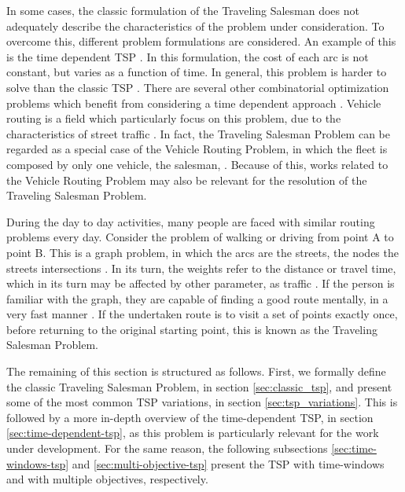 In some cases, the classic formulation of the Traveling Salesman does not adequately describe the characteristics of the problem under consideration. To overcome this, different problem formulations are considered. An example of this is the time dependent TSP \cite{cite_12}. In this formulation, the cost of each arc is not constant, but varies as a function of time. In general, this problem is harder to solve than the classic TSP \cite{cite_21}. There are several other combinatorial optimization problems which benefit from considering a time dependent approach \cite{cite_20}. Vehicle routing is a field which particularly focus on this problem, due to the characteristics of street traffic \cite{cite_19}. In fact, the Traveling Salesman Problem can be regarded as a special case of the Vehicle Routing Problem, in which the fleet is composed by only one vehicle, the salesman, \cite{cite_19}. Because of this, works related to the Vehicle Routing Problem may also be relevant for the resolution of the Traveling Salesman Problem.

During the day to day activities, many people are faced with similar routing problems every day. Consider the problem of walking or driving from point A to point B. This is a graph problem, in which the arcs are the streets, the nodes the streets intersections \cite{cite_11}. In its turn, the weights refer to the distance or travel time, which in its turn may be affected by other parameter, as traffic \cite{cite_12}. If the person is familiar with the graph, they are capable of finding a good route mentally, in a very fast manner \cite{cite_13}. If the undertaken route is to visit a set of points exactly once, before returning to the original starting point, this is known as the Traveling Salesman Problem. 

The remaining of this section is structured as follows. First, we formally define the classic Traveling Salesman Problem, in section \ref{sec:classic_tsp}, and present some of the most common TSP variations, in section \ref{sec:tsp_variations}. This is followed by a more in-depth overview of the time-dependent TSP, in section \ref{sec:time-dependent-tsp}, as this problem is particularly relevant for the work under development. For the same reason, the following subsections \ref{sec:time-windows-tsp} and \ref{sec:multi-objective-tsp} present the TSP with time-windows and with multiple objectives, respectively. 